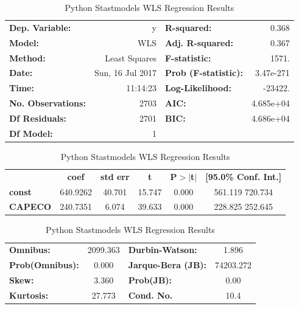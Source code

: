 \begin{table}
	\begin{tabular}{lrlr}
		\textbf{Dep. Variable:}    &        y         & \textbf{  R-squared:         } &     0.368   \\
		\textbf{Model:}            &       WLS        & \textbf{  Adj. R-squared:    } &     0.367   \\
		\textbf{Method:}           &  Least Squares   & \textbf{  F-statistic:       } &     1571.   \\
		\textbf{Date:}             & Sun, 16 Jul 2017 & \textbf{  Prob (F-statistic):} & 3.47e-271   \\
		\textbf{Time:}             &     11:14:23     & \textbf{  Log-Likelihood:    } &   -23422.   \\
		\textbf{No. Observations:} &        2703      & \textbf{  AIC:               } & 4.685e+04   \\
		\textbf{Df Residuals:}     &        2701      & \textbf{  BIC:               } & 4.686e+04   \\
		\textbf{Df Model:}         &           1      & \textbf{                     } &             \\
		
	\end{tabular}
	\begin{tabular}{lccccc}
		& \textbf{coef} & \textbf{std err} & \textbf{t} & \textbf{P$>$$|$t$|$} & \textbf{[95.0\% Conf. Int.]}  \\
		
		\textbf{const} &     640.9262  &       40.701     &    15.747  &         0.000        &       561.119   720.734       \\
		\textbf{CAPECO}    &     240.7351  &        6.074     &    39.633  &         0.000        &       228.825   252.645       \\
		
	\end{tabular}
	\begin{tabular}{lclc}
		\textbf{Omnibus:}       & 2099.363 & \textbf{  Durbin-Watson:     } &     1.896  \\
		\textbf{Prob(Omnibus):} &   0.000  & \textbf{  Jarque-Bera (JB):  } & 74203.272  \\
		\textbf{Skew:}          &   3.360  & \textbf{  Prob(JB):          } &      0.00  \\
		\textbf{Kurtosis:}      &  27.773  & \textbf{  Cond. No.          } &      10.4  \\
		
	\end{tabular}
	\caption{Python Stastmodels WLS Regression Results}
	\label{tab:capecoVipcf}
\end{table}  

